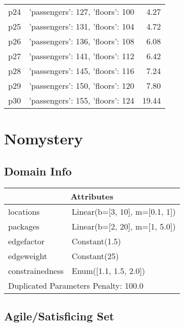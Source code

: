 \documentclass{article}
\begin{document}
\begin{center}
\begin{tabular}{@{}l|r|r@{}}
  p24&{'passengers': 127, 'floors': 100}&4.27\\
  p25&{'passengers': 131, 'floors': 104}&4.72\\
  p26&{'passengers': 136, 'floors': 108}&6.08\\
  p27&{'passengers': 141, 'floors': 112}&6.42\\
  p28&{'passengers': 145, 'floors': 116}&7.24\\
  p29&{'passengers': 150, 'floors': 120}&7.80\\
  p30&{'passengers': 155, 'floors': 124}&19.44
                            \end{tabular}
                            \end{center}
                    
                            \newpage \section{Nomystery}
                    \subsection*{Domain Info}

                    \begin{center}
                    \begin{tabular}{@{}p{}p{}@{}}
                    \multicolumn{2}{c}{\bf \large Attributes}\\\midrule
                    locations & Linear(b=[3, 10], m=[0.1, 1])\\
packages & Linear(b=[2, 20], m=[1, 5.0])\\
edgefactor & Constant(1.5)\\
edgeweight & Constant(25)\\
constrainedness & Enum([1.1, 1.5, 2.0])
                    
                     \\\midrule
                    \multicolumn{2}{l}{Duplicated Parameters Penalty: 100.0}
                    \end{tabular}
                    \end{center}
                
                         \subsection*{Agile/Satisficing Set}
\end{document}
